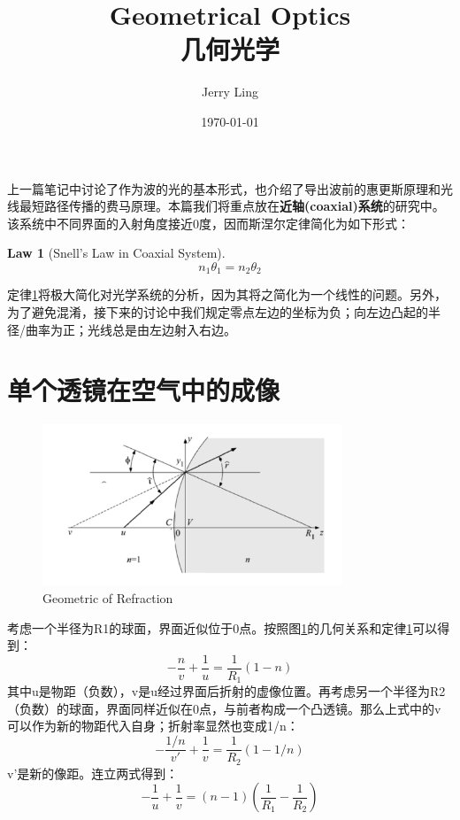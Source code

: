 \documentclass[12pt]{ctexart}%
\title{Geometrical Optics\\几何光学}
\author{Jerry Ling}
\date{\today}
\newtheorem{theorem}{Law}
\begin{document}
\maketitle  %
上一篇笔记中讨论了作为波的光的基本形式，也介绍了导出波前的惠更斯原理和光线最短路径传播的费马原理。本篇我们将重点放在\textbf{近轴(coaxial)系统}的研究中。该系统中不同界面的入射角度接近0度，因而斯涅尔定律简化为如下形式：
\begin{theorem}[Snell's Law in Coaxial System]\label{snell}
    \[n_1\theta_1=n_2\theta_2\]
\end{theorem}
定律\ref{snell}将极大简化对光学系统的分析，因为其将之简化为一个线性的问题。另外，为了避免混淆，接下来的讨论中我们规定零点左边的坐标为负；向左边凸起的半径/曲率为正；光线总是由左边射入右边。
\section*{单个透镜在空气中的成像}
\begin{figure}[t] %
        \centering
        \includegraphics[width=0.8\textwidth]{Image/2_single_lens.png}
        \caption{Geometric of Refraction}
        \label{single_lens_1}
\end{figure}
考虑一个半径为R1的球面，界面近似位于0点。按照图\ref{single_lens_1}的几何关系和定律\ref{snell}可以得到：
\begin{equation}
    -\frac{n}{v}+\frac{1}{u}=\frac{1}{R_1}(1-n)
\end{equation}
其中u是物距（负数），v是u经过界面后折射的虚像位置。再考虑另一个半径为R2（负数）的球面，界面同样近似在0点，与前者构成一个凸透镜。那么上式中的v可以作为新的物距代入自身；折射率显然也变成1/n：
\begin{equation}
    -\frac{1/n}{v'}+\frac{1}{v}=\frac{1}{R_2}(1-1/n)
\end{equation}
v'是新的像距。连立两式得到：
\begin{equation}
    -\frac{1}{u}+\frac{1}{v}=(n-1)(\frac{1}{R_1}-\frac{1}{R_2})
    \label{f}
\end{equation}
\end{document}
